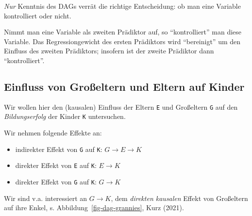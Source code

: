 \documentclass[
  a4paper,
  DIV=11]{scrreprt}
\providecommand{\tightlist}{%
  \setlength{\itemsep}{0pt}\setlength{\parskip}{0pt}}\usepackage{longtable,booktabs,array}
\theoremstyle{definition}
\theoremstyle{remark}
\begin{document}
\emph{Nur} Kenntnis des DAGs verrät die richtige Entscheidung: ob man
eine Variable kontrolliert oder nicht.

\begin{tcolorbox}[enhanced jigsaw, leftrule=.75mm, toptitle=1mm, bottomtitle=1mm, titlerule=0mm, breakable, colframe=quarto-callout-note-color-frame, title=\textcolor{quarto-callout-note-color}{\faInfo}\hspace{0.5em}{Hinweis}, rightrule=.15mm, colback=white, arc=.35mm, left=2mm, bottomrule=.15mm, coltitle=black, opacitybacktitle=0.6, toprule=.15mm, colbacktitle=quarto-callout-note-color!10!white, opacityback=0]
Nimmt man eine Variable als zweiten Prädiktor auf, so ``kontrolliert''
man diese Variable. Das Regressiongewicht des ersten Prädiktors wird
``bereinigt'' um den Einfluss des zweiten Prädiktors; insofern ist der
zweite Prädiktor dann ``kontrolliert''.
\end{tcolorbox}

\hypertarget{einfluss-von-grouxdfeltern-und-eltern-auf-kinder}{%
\subsection{Einfluss von Großeltern und Eltern auf
Kinder}\label{einfluss-von-grouxdfeltern-und-eltern-auf-kinder}}

Wir wollen hier den (kausalen) Einfluss der Eltern \texttt{E} und
Großeltern \texttt{G} auf den \emph{Bildungserfolg} der Kinder
\texttt{K} untersuchen.

Wir nehmen folgende Effekte an:

\begin{itemize}
\tightlist
\item
  indirekter Effekt von \texttt{G} auf \texttt{K}:
  \(G \rightarrow E \rightarrow K\)
\item
  direkter Effekt von \texttt{E} auf \texttt{K}: \(E \rightarrow K\)
\item
  direkter Effekt von \texttt{G} auf \texttt{K}: \(G \rightarrow K\)
\end{itemize}

Wir sind v.a. interessiert an \(G \rightarrow K\), dem \emph{direkten
kausalen} Effekt von Großeltern auf ihre Enkel, s.
Abbildung~\ref{fig-dag-grannies}, Kurz (2021).
\end{document}
